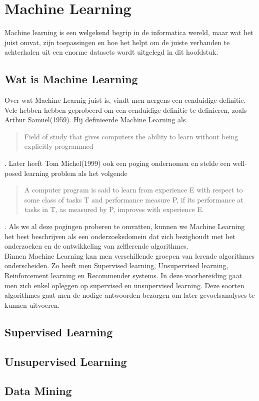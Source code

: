 \section{Machine Learning}\label{Machine Learning}

Machine learning is een welgekend begrip in de informatica wereld, maar wat het juist omvat, zijn toepassingen en hoe het helpt om de juiste verbanden te achterhalen uit een enorme datasets wordt uitgelegd in dit hoofdstuk.

\subsection{Wat is Machine Learning}\label{Wat is Machine Learning}

Over wat Machine Learnig juist is, vindt men nergens een eenduidige definitie. Vele hebben hebben geprobeerd om een eenduidige definitie te definieren, zoals Arthur Samuel(1959). Hij definieerde Machine Learning als \begin{quote}Field of study that gives computers the ability to learn without being explicitly programmed\end{quote}. Later heeft Tom Michel(1999) ook een poging ondernomen en stelde een well-posed learning problem als het volgende \begin{quote} A computer program is said to learn from experience E with respect to some class of tasks T and performance measure P, if its performance at tasks in T, as measured by P, improves with experience E. \end{quote}. Als we al deze pogingen proberen te omvatten, kunnen we Machine Learning het best beschrijven als een onderzoeksdomein dat zich bezighoudt met het onderzoeken en de ontwikkeling van zelflerende algorithmes.
\\
Binnen Machine Learning kan men verschillende groepen van lerende algorithmes onderscheiden. Zo heeft men Supervised learning, Unsupervised learning, Reinforcement learning en Recommender systems. In deze voorbereiding gaat men zich enkel opleggen op supervised en unsupervised learning. Deze soorten algorithmes gaat men de nodige antwoorden bezorgen om later gevoelsanalyses te kunnen uitvoeren.


\subsection{Supervised Learning}\label{Supervised Learning}
\subsection{Unsupervised Learning}\label{Unsupervised Learning}


\subsection{Data Mining}\label{Data Mining}


